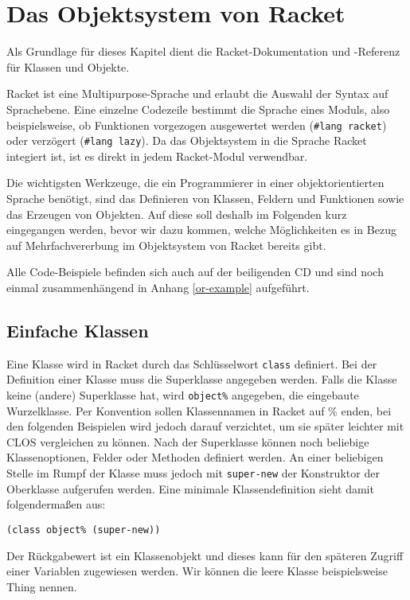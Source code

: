 \section{Das Objektsystem von Racket}
Als Grundlage für dieses Kapitel dient die Racket-Dokumentation \cite{racketguide-classes} und -Referenz \cite{racketref-classes} für Klassen und Objekte.

Racket ist eine Multipurpose-Sprache und erlaubt die Auswahl der Syntax auf Sprachebene. Eine einzelne Codezeile bestimmt die Sprache eines Moduls, also beispielsweise, ob Funktionen vorgezogen ausgewertet werden (\texttt{\#lang racket}) oder verzögert (\texttt{\#lang lazy}). Da das Objektsystem in die Sprache Racket integiert ist, ist es direkt in jedem Racket-Modul verwendbar.

Die wichtigsten Werkzeuge, die ein Programmierer in einer objektorientierten Sprache benötigt, sind das Definieren von Klassen, Feldern und Funktionen sowie das Erzeugen von Objekten. Auf diese soll deshalb im Folgenden kurz eingegangen werden, bevor wir dazu kommen, welche Möglichkeiten es in Bezug auf Mehrfachvererbung im Objektsystem von Racket bereits gibt.

Alle Code-Beispiele befinden sich auch auf der beiligenden CD und sind noch einmal zusammenhängend in Anhang \ref{or-example} aufgeführt. 

\subsection{Einfache Klassen}

Eine Klasse wird in Racket durch das Schlüsselwort \texttt{class} definiert. Bei der Definition einer Klasse muss die Superklasse angegeben werden. Falls die Klasse keine (andere) Superklasse hat, wird \texttt{object\%} angegeben, die eingebaute Wurzelklasse. Per Konvention sollen Klassennamen in Racket auf \% enden, bei den folgenden Beispielen wird jedoch darauf verzichtet, um sie später leichter mit CLOS vergleichen zu können. Nach der Superklasse können noch beliebige Klassenoptionen, Felder oder Methoden definiert werden. An einer beliebigen Stelle im Rumpf der Klasse muss jedoch mit \texttt{super-new} der Konstruktor der Oberklasse aufgerufen werden. Eine minimale Klassendefinition sieht damit folgendermaßen aus:

\begin{lstlisting}
(class object% (super-new))
\end{lstlisting}

Der Rückgabewert ist ein Klassenobjekt und dieses kann für den späteren Zugriff einer Variablen zugewiesen werden. Wir können die leere Klasse beispielsweise Thing nennen.

